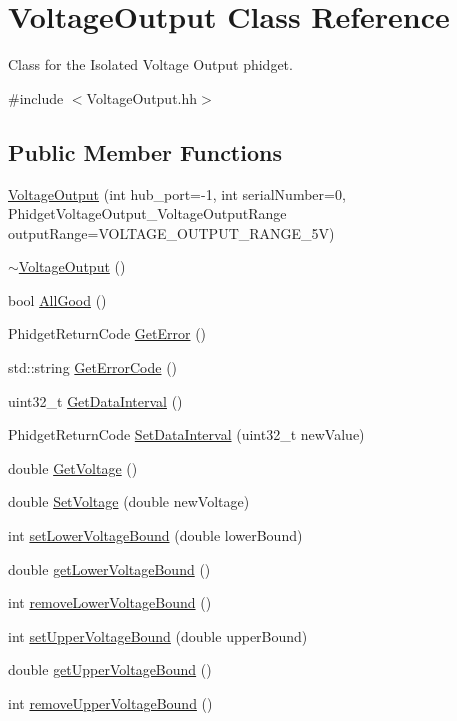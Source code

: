 \hypertarget{classVoltageOutput}{}\section{Voltage\+Output Class Reference}
\label{classVoltageOutput}


Class for the Isolated Voltage Output phidget.  




{\ttfamily \#include $<$Voltage\+Output.\+hh$>$}

\subsection*{Public Member Functions}
\begin{DoxyCompactItemize}
\item 
\hyperlink{classVoltageOutput_ae75a945e1fdd2f2706e19f7b65035f21}{Voltage\+Output} (int hub\+\_\+port=-\/1, int serial\+Number=0, Phidget\+Voltage\+Output\+\_\+\+Voltage\+Output\+Range output\+Range=V\+O\+L\+T\+A\+G\+E\+\_\+\+O\+U\+T\+P\+U\+T\+\_\+\+R\+A\+N\+G\+E\+\_\+5V)
\item 
\hyperlink{classVoltageOutput_a15d66c37a266d47cc8cab240b6f75f2d}{$\sim$\+Voltage\+Output} ()
\item 
bool \hyperlink{classVoltageOutput_a776a9b2fbb8de116ff2309f68f44f95a}{All\+Good} ()
\item 
Phidget\+Return\+Code \hyperlink{classVoltageOutput_a15385564cb794f9f721d569744a75324}{Get\+Error} ()
\item 
std\+::string \hyperlink{classVoltageOutput_aed7361d39503b4eea66c0e07873de681}{Get\+Error\+Code} ()
\item 
uint32\+\_\+t \hyperlink{classVoltageOutput_a0b2c89409dddac6283ac3914b4780b4e}{Get\+Data\+Interval} ()
\item 
Phidget\+Return\+Code \hyperlink{classVoltageOutput_af89b733d740081ac529ea890322a4e1b}{Set\+Data\+Interval} (uint32\+\_\+t new\+Value)
\item 
double \hyperlink{classVoltageOutput_ae26abd606ada2431e58d89e482dcaaad}{Get\+Voltage} ()
\item 
double \hyperlink{classVoltageOutput_a1e8a1a0f8ce9c8ecec3b14f6664f3b1b}{Set\+Voltage} (double new\+Voltage)
\item 
int \hyperlink{classVoltageOutput_ae368cb74e971d814564e08d6d4356291}{set\+Lower\+Voltage\+Bound} (double lower\+Bound)
\item 
double \hyperlink{classVoltageOutput_a4cde47f0072ffdfbf53052318b3ce23f}{get\+Lower\+Voltage\+Bound} ()
\item 
int \hyperlink{classVoltageOutput_a1581c950b526434d13afbc3de658b045}{remove\+Lower\+Voltage\+Bound} ()
\item 
int \hyperlink{classVoltageOutput_a252ec58d9c49ee7de880efd23f7feedc}{set\+Upper\+Voltage\+Bound} (double upper\+Bound)
\item 
double \hyperlink{classVoltageOutput_a4d320fa01d68f05d30df9c6a8d6b3cfe}{get\+Upper\+Voltage\+Bound} ()
\item 
int \hyperlink{classVoltageOutput_a97586770671b49fa91611f5c2132b41a}{remove\+Upper\+Voltage\+Bound} ()
\end{DoxyCompactItemize}


